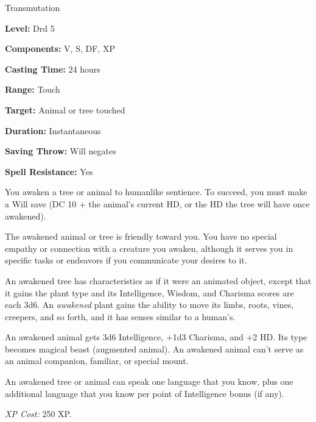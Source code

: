 
Transmutation

\textbf{Level:} Drd 5

\textbf{Components:} V, S, DF, XP

\textbf{Casting Time:} 24 hours

\textbf{Range:} Touch

\textbf{Target:} Animal or tree touched

\textbf{Duration:} Instantaneous

\textbf{Saving Throw:} Will negates

\textbf{Spell Resistance:} Yes

You awaken a tree or animal to humanlike sentience. To succeed, you must make a 
Will save (DC 10 + the animal's current HD, or the HD the tree will have once awakened).

The awakened animal or tree is friendly toward you. You have no special 
empathy or connection with a creature you awaken, although it serves you in specific 
tasks or endeavors if you communicate your desires to it.

An awakened tree has characteristics as if it were an animated object, 
except that it gains the plant type and its Intelligence, Wisdom, and Charisma 
scores are each 3d6. An \textit{awakened} plant gains the ability to move its limbs, 
roots, vines, creepers, and so forth, and it has senses similar to a human's.

An awakened animal gets 3d6 Intelligence, +1d3 Charisma, and +2 HD. Its 
type becomes magical beast (augmented animal). An awakened animal can't serve as 
an animal companion, familiar, or special mount.

An awakened tree or animal can speak one language that you know, plus 
one additional language that you know per point of Intelligence bonus (if any).

\textit{XP Cost:} 250 XP.

